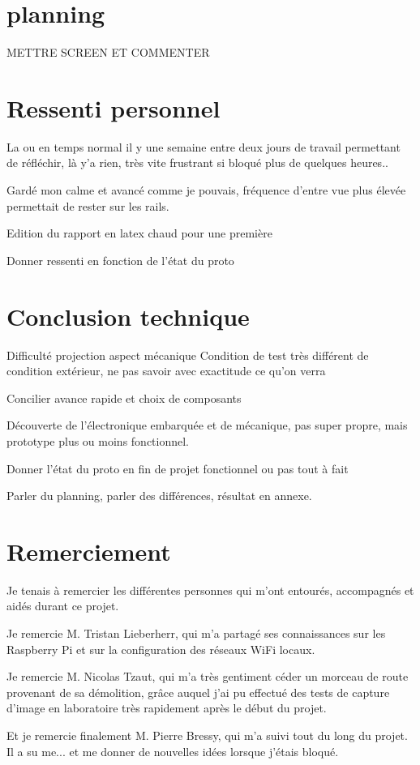 \section{planning}
METTRE SCREEN ET COMMENTER

\section{Ressenti personnel}
La ou en temps normal il y une semaine entre deux jours de travail permettant de réfléchir, là y'a rien, très vite frustrant si bloqué plus de quelques heures..

Gardé mon calme et avancé comme je pouvais, fréquence d'entre vue plus élevée permettait de rester sur les rails.

Edition du rapport en latex chaud pour une première

Donner ressenti en fonction de l'état du proto
\section{Conclusion technique}
Difficulté projection aspect mécanique
Condition de test très différent de condition extérieur, ne pas savoir avec exactitude ce qu'on verra

Concilier avance rapide et choix de composants

Découverte de l'électronique embarquée et de mécanique, pas super propre, mais prototype plus ou moins fonctionnel.

Donner l'état du proto en fin de projet fonctionnel ou pas tout à fait

Parler du planning, parler des différences, résultat en annexe.
\section{Remerciement}
Je tenais à remercier les différentes personnes qui m'ont entourés, accompagnés et aidés durant ce projet.

Je remercie M. Tristan Lieberherr, qui m'a partagé ses connaissances sur les Raspberry Pi et sur la configuration des réseaux WiFi locaux.

Je remercie M. Nicolas Tzaut, qui m'a très gentiment céder un morceau de route provenant de sa démolition, grâce auquel j'ai pu effectué
des tests de capture d'image en laboratoire très rapidement après le début du projet.

Et je remercie finalement M. Pierre Bressy, qui m'a suivi tout du long du projet. Il a su me... et me donner de nouvelles idées lorsque
j'étais bloqué.
\vfil
\hspace{8cm}\makeatletter\@author\makeatother\par
\hspace{8cm}\begin{minipage}{5cm}
    \printsignature
\end{minipage}